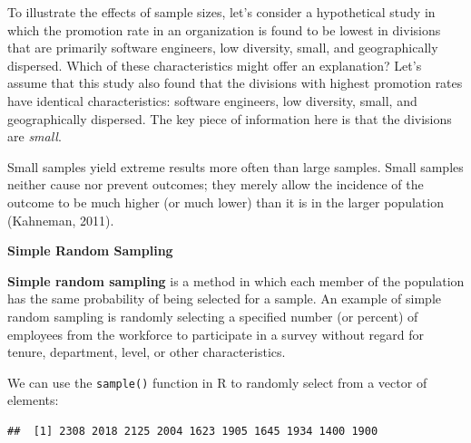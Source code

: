 \documentclass[
]{book}
\newenvironment{Shaded}{\begin{snugshade}}{\end{snugshade}}
\newcommand{\AttributeTok}[1]{\textcolor[rgb]{0.77,0.63,0.00}{#1}}
\newcommand{\CommentTok}[1]{\textcolor[rgb]{0.56,0.35,0.01}{\textit{#1}}}
\newcommand{\DecValTok}[1]{\textcolor[rgb]{0.00,0.00,0.81}{#1}}
\newcommand{\FunctionTok}[1]{\textcolor[rgb]{0.00,0.00,0.00}{#1}}
\newcommand{\NormalTok}[1]{#1}
\newcommand{\OtherTok}[1]{\textcolor[rgb]{0.56,0.35,0.01}{#1}}
\newcommand{\SpecialCharTok}[1]{\textcolor[rgb]{0.00,0.00,0.00}{#1}}
\newcommand{\StringTok}[1]{\textcolor[rgb]{0.31,0.60,0.02}{#1}}
\begin{document}
To illustrate the effects of sample sizes, let's consider a hypothetical study in which the promotion rate in an organization is found to be lowest in divisions that are primarily software engineers, low diversity, small, and geographically dispersed. Which of these characteristics might offer an explanation? Let's assume that this study also found that the divisions with highest promotion rates have identical characteristics: software engineers, low diversity, small, and geographically dispersed. The key piece of information here is that the divisions are \emph{small}.

Small samples yield extreme results more often than large samples. Small samples neither cause nor prevent outcomes; they merely allow the incidence of the outcome to be much higher (or much lower) than it is in the larger population (Kahneman, 2011).

\textbf{Simple Random Sampling}

\textbf{Simple random sampling} is a method in which each member of the population has the same probability of being selected for a sample. An example of simple random sampling is randomly selecting a specified number (or percent) of employees from the workforce to participate in a survey without regard for tenure, department, level, or other characteristics.

We can use the \texttt{sample()} function in R to randomly select from a vector of elements:

\begin{Shaded}
\end{Shaded}

\begin{verbatim}
##  [1] 2308 2018 2125 2004 1623 1905 1645 1934 1400 1900
\end{verbatim}
\end{document}
